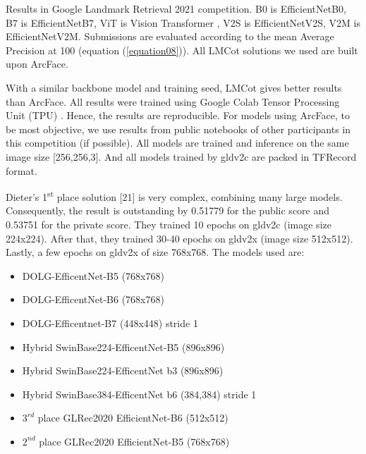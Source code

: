 \begin{table}[htpb]
\begin{threeparttable}
    \begin{tablenotes}
      \small
      \item Results in Google Landmark Retrieval 2021 competition. B0 is EfficientNetB0\cite{tan2019efficientnet}, B7 is EfficientNetB7\cite{tan2019efficientnet}, ViT is Vision Transformer \cite{dosovitskiy2020image}, V2S is EfficientNetV2S\cite{tan2021efficientnetv2}, V2M is EfficientNetV2M\cite{tan2021efficientnetv2}. Submissions are evaluated according to the mean Average Precision at 100 (equation (\ref{equation08})). All LMCot solutions we used are built upon ArcFace.
    \end{tablenotes}
\end{threeparttable}
\end{table}

With a similar backbone model and training seed, LMCot gives better results than ArcFace. All results were trained using Google Colab Tensor Processing Unit (TPU) \cite{jouppi2017datacenter}. Hence, the results are reproducible. For models using ArcFace, to be most objective, we use results from public notebooks of other participants in this competition (if possible). All models are trained and inference on the same image size [256,256,3]. And all models trained by gldv2c are packed in TFRecord format.

Dieter's 1\textsuperscript{st} place solution [21] is very complex, combining many large models. Consequently, the result is outstanding by 0.51779 for the public score and 0.53751 for the private score. They trained 10 epochs on gldv2c (image size 224x224). After that, they trained 30-40 epochs on gldv2x (image size 512x512). Lastly, a few epochs on gldv2x of size 768x768. The models used are:

\begin{itemize}
    \item DOLG-EfficentNet-B5 (768x768) \cite{yang2021dolg}
    \item DOLG-EfficentNet-B6 (768x768) \cite{yang2021dolg}
    \item DOLG-Efficentnet-B7 (448x448) stride 1 \cite{yang2021dolg}
    \item Hybrid SwinBase224-EfficentNet-B5 (896x896) \cite{liu2021swin}
    \item Hybrid SwinBase224-EfficentNet b3 (896x896) \cite{liu2021swin}
    \item Hybrid SwinBase384-EfficentNet b6 (384,384) stride 1 \cite{liu2021swin}
    \item $3^{rd}$ place GLRec2020 EfficientNet-B6 (512x512) \cite{ha2020google}
    \item $2^{nd}$ place GLRec2020 EfficientNet-B5 (768x768) \cite{shubin2020google}
\end{itemize}

